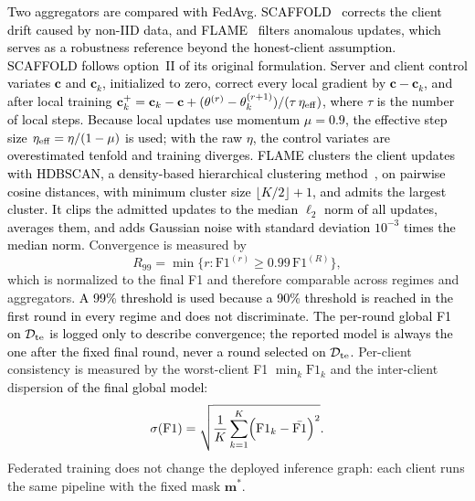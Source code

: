 \documentclass[conference]{IEEEtran}
\begin{document}
\textcolor{black}{Two aggregators are compared with FedAvg.
SCAFFOLD~\cite{karimireddy2020scaffold} corrects the client drift
caused by non-IID data, and FLAME~\cite{nguyen2022flame} filters
anomalous updates, which serves as a robustness reference beyond the
honest-client assumption. SCAFFOLD follows
option~II of its original formulation. Server and client control variates $\mathbf{c}$ and
$\mathbf{c}_k$, initialized to zero, correct every local gradient by
$\mathbf{c}-\mathbf{c}_k$, and after local training
$\mathbf{c}_k^{+}=\mathbf{c}_k-\mathbf{c}+(\theta^{(r)}-
\theta_k^{(r+1)})/(\tau\,\eta_{\rm eff})$, where $\tau$ is the number
of local steps. Because local updates use momentum $\mu=0.9$, the
effective step size $\eta_{\rm eff}=\eta/(1-\mu)$ is used; with the
raw $\eta$, the control variates are overestimated tenfold and
training diverges. FLAME clusters the client
updates with HDBSCAN, a density-based hierarchical clustering
method~\cite{campello2013hdbscan}, on pairwise cosine distances, with minimum cluster size
$\lfloor K/2\rfloor+1$, and admits the largest cluster. It clips the
admitted updates to the median $\ell_2$ norm of all updates, averages
them, and adds Gaussian noise with standard deviation $10^{-3}$ times
the median norm.} Convergence is measured by
\begin{equation}
R_{99}=\min\bigl\{r:\mathrm{F1}^{(r)}\ge
0.99\,\mathrm{F1}^{(R)}\bigr\},
\label{eq:r90}
\end{equation}
which is normalized to the final F1 and therefore comparable across
regimes and aggregators.
\textcolor{black}{A 99\% threshold is used
because a 90\% threshold is reached in the first round in every regime
and does not discriminate.} \textcolor{black}{The per-round global F1 on
$\mathcal{D}_{\rm te}$ is logged only to describe convergence; the
reported model is always the one after the fixed final round, never a
round selected on $\mathcal{D}_{\rm te}$.} Per-client consistency is
measured by the worst-client F1 $\min_k\mathrm{F1}_k$ and the
inter-client dispersion \textcolor{black}{of the final global
model}:
\begin{equation}
\sigma\!\left(\mathrm{F1}\right)=
\sqrt{\frac{1}{K}\sum_{k=1}^{K}
\Bigl(\mathrm{F1}_k-\bar{\mathrm{F1}}\Bigr)^2}.
\label{eq:client_var_round}
\end{equation}
Federated training does not change the deployed inference graph:
each client runs the same pipeline with the fixed mask
$\mathbf{m}^{*}$.

\end{document}
